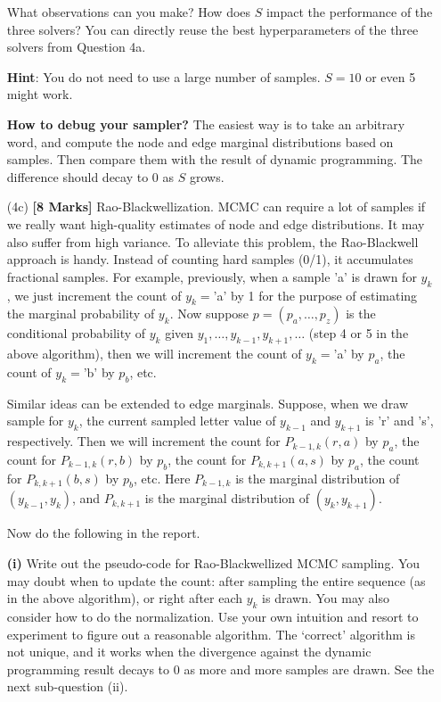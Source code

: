 \documentclass[11pt]{report}
\begin{document}
\begin{itemize}
	
	What observations can you make?  How does $S$ impact the performance of the three solvers?
	You can directly reuse the best hyperparameters of the three solvers from Question 4a.
		
	\textbf{Hint}: You do not need to use a large number of samples.  $S=10$ or even 5 might work.
	
	\textbf{How to debug your sampler?} The easiest way is to take an arbitrary word, and compute the node and edge marginal distributions based on samples.  Then compare them with the result of dynamic programming.  The difference should decay to 0 as $S$ grows.
	
	\item[(4c)] {\bf [8 Marks]} 
	Rao-Blackwellization. 
	MCMC can require a lot of samples if we really want high-quality estimates of node and edge distributions.
	It may also suffer from high variance.
	To alleviate this problem, the Rao-Blackwell approach is handy.
	Instead of counting hard samples (0/1), it accumulates fractional samples.
	For example, previously, when a sample 'a' is drawn for $y_k$, 
	we just increment the count of $y_k = $'a' by 1 for the purpose of estimating the marginal probability of $y_k$.
	Now suppose $p=(p_a, \ldots, p_z)$ is the conditional probability of $y_k$ given $y_1, \ldots, y_{k-1}, y_{k+1}, \ldots$ (step 4 or 5 in the above algorithm), then we will increment the count of $y_k = $'a' by $p_a$,
	the count of $y_k = $'b' by $p_b$, etc.
	
	Similar ideas can be extended to edge marginals.
	Suppose, when we draw sample for $y_k$, 
	the current sampled letter value of $y_{k-1}$ and $y_{k+1}$ is 'r' and 's', respectively.
	Then we will increment the count for $P_{k-1,k}(r, a)$ by $p_a$, 
	the count for $P_{k-1,k}(r, b)$ by $p_b$, 
	the count for $P_{k,k+1}(a, s)$ by $p_a$, 
	the count for $P_{k,k+1}(b, s)$ by $p_b$, 
	etc.
	Here $P_{k-1,k}$ is the marginal distribution of $(y_{k-1}, y_k)$,
	and $P_{k,k+1}$ is the marginal distribution of $(y_k, y_{k+1})$.
	
	Now do the following in the report.
	
	\textbf{(i)}  Write out the pseudo-code for Rao-Blackwellized MCMC sampling.  
	You may doubt when to update the count:
	after sampling the entire sequence (as in the above algorithm),
	or right after each $y_k$ is drawn.
	You may also consider how to do the normalization.
	Use your own intuition and resort to experiment to figure out a reasonable algorithm.
	The `correct' algorithm is not unique, and it works when the divergence against the dynamic programming result decays to 0 as more and more samples are drawn.
	See the next sub-question (ii).
	

\end{itemize}
\end{document}
